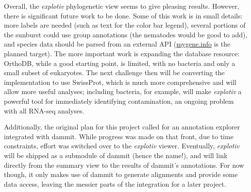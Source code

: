 \documentclass[12pt]{article} %
\begin{document}
Overall, the \textit{explotiv} phylogenetic view seems to give pleasing results. However, there is significant future work to be done. Some of this
work is in small details: more labels are needed (such as text for the color bar legend), several portions of the sunburst could use group annotations
(the nematodes would be good to add), and species data should be parsed from an external API (\url{mygene.info} is the planned target). The more
important work is expanding the database resource: OrthoDB, while a good starting point, is limited, with no bacteria and only a small subset of
eukaryotes. The next challenge then will be converting the implementation to use SwissProt, which is much more comprehensive and will allow
more useful analyses; including bacteria, for example, will make \textit{explotiv} a powerful tool for immediately identifying contamination, an
ongoing problem with all RNA-seq analyses.

Additionally, the original plan for this project called for an annotation explorer integrated with dammit. While progress was made on that front,
due to time constraints, effort was switched over to the \textit{explotiv} viewer. Eventually, \textit{explotiv} will be shipped as a submodule
of dammit (hence the name!), and will link directly from the summary view to the results of dammit's annotations. For now though, it only
makes use of dammit to generate alignments and provide some data access, leaving the messier parts of the integration for a later project.



\end{document}
